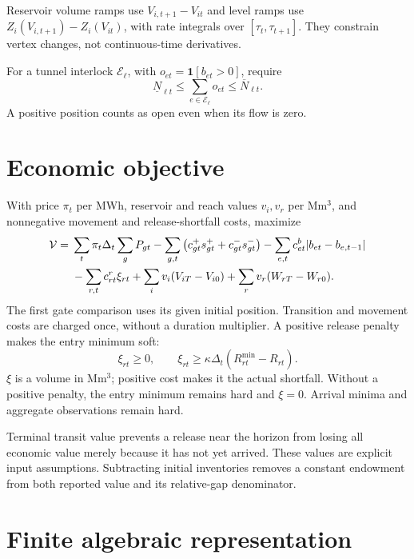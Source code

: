 \documentclass[10pt,a4paper]{article}
\begin{document}
Reservoir volume ramps use $V_{i,t+1}-V_{it}$ and level ramps use
$Z_i(V_{i,t+1})-Z_i(V_{it})$, with rate integrals over
$[\tau_t,\tau_{t+1}]$. They constrain vertex changes, not continuous-time
derivatives.

For a tunnel interlock $\mathcal E_\ell$, with
$o_{et}=\mathbf1[b_{et}>0]$, require
\begin{equation}
\underline N_{\ell t}\le\sum_{e\in\mathcal E_\ell}o_{et}
\le\overline N_{\ell t}.
\label{eq:interlock}
\end{equation}
A positive position counts as open even when its flow is zero.

\section{Economic objective}

With price $\pi_t$ per MWh, reservoir and reach values $v_i,v_r$ per Mm$^3$,
and nonnegative movement and release-shortfall costs, maximize
\begin{align}
\mathcal V={}&\sum_t\pi_t\Delta_t\sum_g P_{gt}
-\sum_{g,t}\left(c^+_{gt}s^+_{gt}+c^-_{gt}s^-_{gt}\right)
-\sum_{e,t}c^b_{et}|b_{et}-b_{e,t-1}| \notag\\
&-\sum_{r,t}c^r_{rt}\xi_{rt}
+\sum_i v_i(V_{iT}-V_{i0})
+\sum_r v_r(W_{rT}-W_{r0}).
\label{eq:objective}
\end{align}
The first gate comparison uses its given initial position. Transition and
movement costs are charged once, without a duration multiplier.
A positive release penalty makes the entry minimum soft:
\begin{equation}
\xi_{rt}\ge0,\qquad
\xi_{rt}\ge\kappa\Delta_t(R_{rt}^{\min}-R_{rt}).
\label{eq:shortfall}
\end{equation}
$\xi$ is a volume in Mm$^3$; positive cost makes it the actual shortfall.
Without a positive penalty, the entry minimum remains hard and $\xi=0$.
Arrival minima and aggregate observations remain hard.

Terminal transit value prevents a release near the horizon from losing all
economic value merely because it has not yet arrived. These values are
explicit input assumptions. Subtracting initial inventories removes a
constant endowment from both reported value and its relative-gap denominator.

\section{Finite algebraic representation}
\label{sec:graphs}
\end{document}
